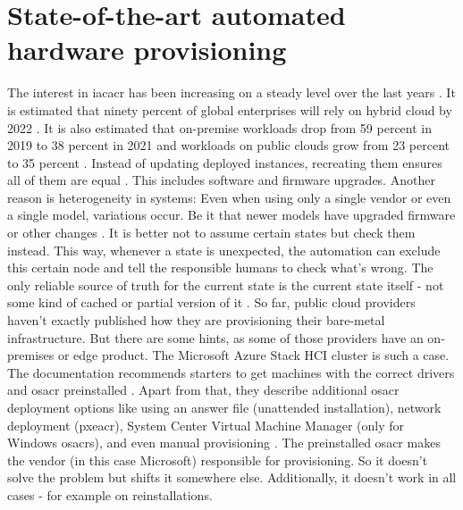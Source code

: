 \section{State-of-the-art automated hardware provisioning} %
The interest in \gls{iacacr} has been increasing on a steady level over the last years \cite{googletrends_iac}.
\newline
It is estimated that ninety percent of global enterprises will rely on hybrid cloud by 2022 \cite{idc_covid_multicloud}.
It is also estimated that on-premise workloads drop from 59 percent in 2019 to 38 percent in 2021 and workloads on public clouds grow from 23 percent to 35 percent \cite{thestreet_public_cloud_spending_covid}.
\newline
Instead of updating deployed instances, recreating them ensures all of them are equal \cite{iac_bare_metal}. This includes software and firmware upgrades.
\newline
Another reason is heterogeneity in systems: Even when using only a single vendor or even a single model, variations occur. Be it that newer models have upgraded firmware or other  changes \cite{iac_bare_metal}.
\newline
It is better not to assume certain states but check them instead. This way, whenever a state is unexpected, the automation can exclude this certain node and tell the responsible humans to check what's wrong. The only reliable source of truth for the current state is the current state itself - not some kind of cached or partial version of it \cite{iac_bare_metal}.
\newline
So far, public cloud providers haven't exactly published how they are provisioning their bare-metal infrastructure.
\newline
But there are some hints, as some of those providers have an on-premises or edge product. The Microsoft Azure Stack HCI cluster is such a case. The documentation recommends starters to get machines with the correct drivers and \gls{osacr} preinstalled \cite{microsoft_azure_stack_deployment}. Apart from that, they describe additional \gls{osacr} deployment options like using an answer file (unattended installation), network deployment (\gls{pxeacr}), System Center Virtual Machine Manager (only for Windows \gls{osacr}s), and even manual provisioning \cite{microsoft_azure_stack_deployment}. The preinstalled \gls{osacr} makes the vendor (in this case Microsoft) responsible for provisioning. So it doesn't solve the problem but shifts it somewhere else. Additionally, it doesn't work in all cases - for example on reinstallations.
